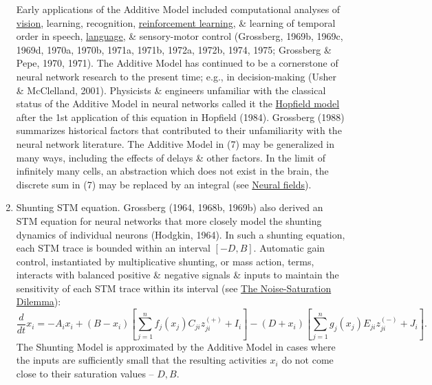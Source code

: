 \documentclass{article}
\begin{document}
\begin{enumerate}
\begin{equation}
	\end{equation}
	Early applications of the Additive Model included computational analyses of \href{http://www.scholarpedia.org/article/Vision}{vision}, learning, recognition, \href{http://www.scholarpedia.org/article/Reinforcement_learning}{reinforcement learning}, \& learning of temporal order in speech, \href{http://www.scholarpedia.org/article/Language}{language}, \& sensory-motor control (Grossberg, 1969b, 1969c, 1969d, 1970a, 1970b, 1971a, 1971b, 1972a, 1972b, 1974, 1975; Grossberg \& Pepe, 1970, 1971). The Additive Model has continued to be a cornerstone of neural network research to the present time; e.g., in decision-making (Usher \& McClelland, 2001). Physicists \& engineers unfamiliar with the classical status of the Additive Model in neural networks called it the \href{http://www.scholarpedia.org/article/Hopfield_model}{Hopfield model} after the 1st application of this equation in Hopfield (1984). Grossberg (1988) summarizes historical factors that contributed to their unfamiliarity with the neural network literature. The Additive Model in (7) may be generalized in many ways, including the effects of delays \& other factors. In the limit of infinitely many cells, an abstraction which does not exist in the brain, the discrete sum in (7) may be replaced by an integral (see \href{http://www.scholarpedia.org/article/Neural_fields}{Neural fields}).
	\item {\sf Shunting STM equation.} Grossberg (1964, 1968b, 1969b) also derived an STM equation for neural networks that more closely model the shunting dynamics of individual neurons (Hodgkin, 1964). In such a shunting equation, each STM trace is bounded within an interval $[-D,B]$. Automatic gain control, instantiated by multiplicative shunting, or mass action, terms, interacts with balanced positive \& negative signals \& inputs to maintain the sensitivity of each STM trace within its interval (see \href{http://www.scholarpedia.org/article/Recurrent_neural_networks#The_Noise-Saturation_Dilemma}{The Noise-Saturation Dilemma}):
	\begin{equation}
		\frac{d}{dt}x_i = -A_ix_i + (B - x_i)\left[\sum_{j=1}^n f_j(x_j)C_{ji}z_{ji}^{(+)} + I_i\right] - (D + x_i)\left[\sum_{j=1}^n g_j(x_j)E_{ji}z_{ji}^{(-)} + J_i\right] .
	\end{equation}
	The Shunting Model is approximated by the Additive Model in cases where the inputs are sufficiently small that the resulting activities $x_i$ do not come close to their saturation values -- $D,B$.
	

\end{enumerate}
\end{document}
